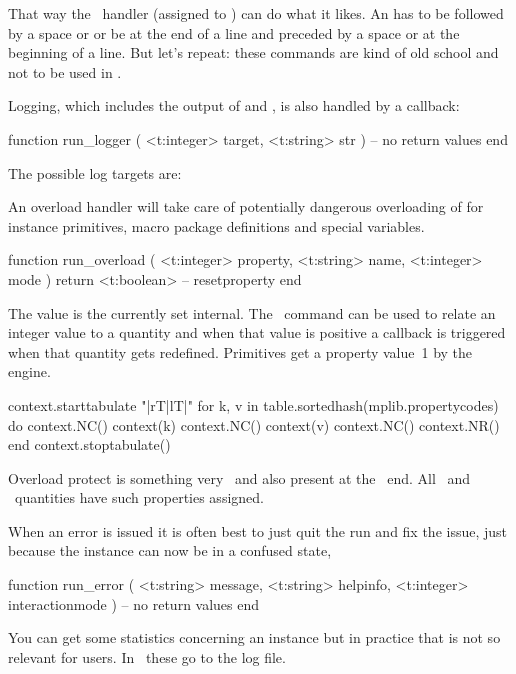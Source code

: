 That way the \LUA\ handler (assigned to ) can do what it likes.
An  has to be followed by a space or \type [option=MP]
{;} or be at the end of a line and preceded by a space or at the beginning of a
line. But let's repeat: these commands are kind of old school and not to be used
in \LUAMETAFUN.

Logging, which includes the output of  and , is also
handled by a callback:

\starttyping[option=LUA]
function run_logger ( <t:integer> target, <t:string> str )
    -- no return values
end
\stoptyping

The possible log targets are:


An overload handler will take care of potentially dangerous overloading of for
instance primitives, macro package definitions and special variables.

\starttyping[option=LUA]
function run_overload ( <t:integer> property, <t:string> name, <t:integer> mode )
    return <t:boolean> -- resetproperty
end
\stoptyping

The  value is the currently set 
internal. The \METAPOST\ command  can be used to
relate an integer value to a quantity and when that value is positive a callback
is triggered when that quantity gets redefined. Primitives get a property value~1
by the engine.

\startluacode
context.starttabulate { "|rT|lT|" }
for k, v in table.sortedhash(mplib.propertycodes) do
    context.NC() context(k)
    context.NC() context(v)
    context.NC() context.NR()
end
context.stoptabulate()
\stopluacode

Overload protect is something very \CONTEXT\ and also present at the \TEX\ end.
All \TEX\ and \METAPOST\ quantities have such properties assigned.

When an error is issued it is often best to just quit the run and fix the issue,
just because the instance can now be in a confused state,

\starttyping[option=LUA]
function run_error (
    <t:string>  message,
    <t:string>  helpinfo,
    <t:integer> interactionmode
)
    -- no return values
end
\stoptyping

You can get some statistics concerning an instance but in practice that is not so
relevant for users. In \CONTEXT\ these go to the log file.

